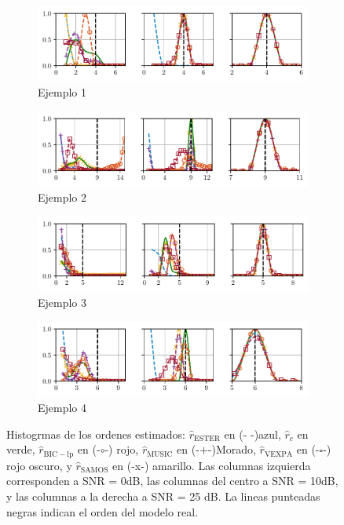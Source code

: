 \begin{figure}[H]
	\centering
	\begin{subfigure}[b]{\textwidth}
		\centering
		\includegraphics[width=\linewidth]{Figuras/Histogram_order_ex1_vexpa.pdf}
		\caption{Ejemplo 1}
	\end{subfigure}
	\begin{subfigure}[b]{\textwidth}
		\centering
		\includegraphics[width=\linewidth]{Figuras/Histogram_order_ex2_vexpa.pdf}
		\caption{Ejemplo 2}
	\end{subfigure}
	\begin{subfigure}[b]{\textwidth}
		\centering
		\includegraphics[width=\linewidth]{Figuras/Histogram_order_ex3_vexpa.pdf}
		\caption{Ejemplo 3}
	\end{subfigure}
	\begin{subfigure}[b]{\textwidth}
		\centering
		\includegraphics[width=\linewidth]{Figuras/Histogram_order_ex4_vexpa.pdf}
		\caption{Ejemplo 4}
	\end{subfigure}
	\caption{Histogrmas de los ordenes estimados: $\hat{r}_{\mathrm{ESTER}}$ en (- -)azul, $\hat{r}_{c}$ en verde, $\hat{r}_{\mathrm{BIC-lp}}$ en (-$\circ$-) rojo, $\hat{r}_{\mathrm{MUSIC}}$ en (-$+$-)Morado, $\hat{r}_{\mathrm{VEXPA}}$ en (-$\square$-) rojo oscuro, y $\hat{r}_{\mathrm{SAMOS}}$ en (-x-) amarillo. Las columnas izquierda corresponden a SNR = 0dB, las columnas del centro a SNR = 10dB, y las columnas a la derecha a SNR = 25 dB. La lineas punteadas negras indican el orden del modelo real.}	\label{fig:hist}
\end{figure}

